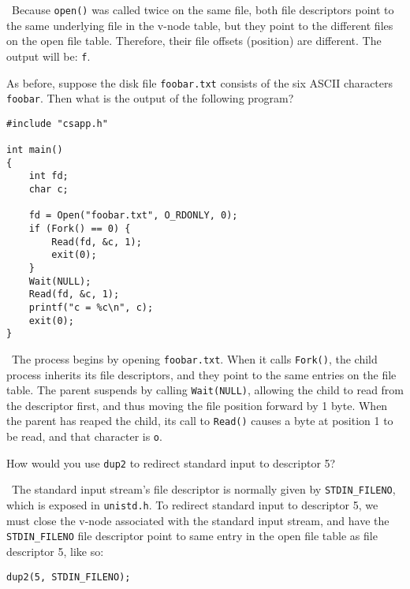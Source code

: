 \documentclass[12pt]{article}
\newenvironment{ex}[2][Exercise]{\begin{trivlist}
		\item[\hskip \labelsep {\bfseries #1}\hskip \labelsep {\bfseries #2.}]}{\end{trivlist}}
\newenvironment{sol}[1][Solution]{\begin{trivlist}
		\item[\hskip \labelsep {\bfseries #1:}]}{\end{trivlist}}
\begin{document}
\begin{sol}
	\
	Because \texttt{open()} was called twice on the same file, both file descriptors point
	to the same underlying file in the v-node table, but they point to the different files
	on the open file table. Therefore, their file offsets (position) are different.
	The output will be: \texttt{f}.
\end{sol}

\begin{ex}{10.3}
	As before, suppose the disk file \texttt{foobar.txt} consists of the six ASCII characters
	\texttt{foobar}. Then what is the output of the following program?
	\begin{lstlisting}
#include "csapp.h"

int main()
{
	int fd;
	char c;
	
	fd = Open("foobar.txt", O_RDONLY, 0);
	if (Fork() == 0) {
		Read(fd, &c, 1);
		exit(0);
	}
	Wait(NULL);
	Read(fd, &c, 1);
	printf("c = %c\n", c);
	exit(0);
}
	\end{lstlisting}
\end{ex}

\begin{sol}
	\
	The process begins by opening \texttt{foobar.txt}. When it calls \texttt{Fork()}, the child
	process inherits its file descriptors, and they point to the same entries on the file table.
	The parent suspends by calling \texttt{Wait(NULL)}, allowing the child to read from the
	descriptor first, and thus moving the file position forward by 1 byte. When the parent has
	reaped the child, its call to \texttt{Read()} causes a byte at position 1 to be read,
	and that character is \texttt{o}.
\end{sol}

\begin{ex}{10.4}
	How would you use \texttt{dup2} to redirect standard input to descriptor 5?
\end{ex}

\begin{sol}
	\
	The standard input stream's file descriptor is normally given by \texttt{STDIN\_FILENO},
	which is exposed in \texttt{unistd.h}. To redirect standard input to descriptor 5,
	we must close the v-node associated with the standard input stream, and have the
	\texttt{STDIN\_FILENO} file descriptor point to same entry in the open file table as
	file descriptor 5, like so:
	\begin{lstlisting}
dup2(5, STDIN_FILENO);
	\end{lstlisting}
	
\end{sol}
\end{document}
